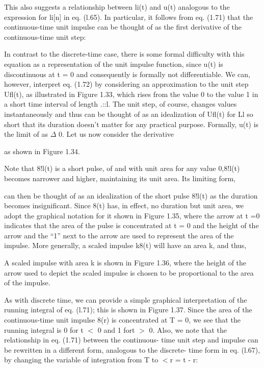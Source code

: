 \documentclass{report}
\begin{document}
This also suggests a relationship between li(t) and u(t) analogous to the expression for li[n] in eq. (l.65). In particular, it follows from eq.
(1.71) that the continuous-time unit impulse can be thought of as the first derivative of the continuous-time unit step:



In contrast to the discrete-time case, there is some formal difficulty with this equation as a representation of the unit impulse function, since
u(t) is discontinuous at t = 0 and consequently is formally not differentiable. We can, however, interpret eq. (1.72) by considering an approximation
to the unit step Ufl(t), as illustrated in Figure 1.33, which rises from the value 0 to the value 1 in a short time interval of length .::l. The
unit step, of course, changes values instantaneously and thus can be thought of as an idealization of Ufl(t) for Ll so short that its duration doesn{'}t
matter for any practical purpose. Formally, u(t) is the limit of { } { } { }as $\Delta $ { } 0. Let us now consider the derivative



as shown in Figure 1.34.



Note that 8!l(t) is a short pulse, of { } { } { } { } { } and with unit area for any value { } { } { } { } { } { }0,8!l(t) becomes narrower and higher,
maintaining its unit area. Its limiting form,



can then be thought of as an idealization of the short pulse 8!l(t) as the duration becomes insignificant. Since 8(t) has, in effect, no duration
but unit area, we adopt the graphical notation for it shown in Figure 1.35, where the arrow at t =0 indicates that the area of the pulse is concentrated
at t = 0 and the height of the arrow and the {``}1{''} next to the arrow are used to represent the area of the impulse. More generally, a scaled
impulse k8(t) will have an area k, and thus,

 

A scaled impulse with area k is shown in Figure 1.36, where the height of the arrow used to depict the scaled impulse is chosen to be proportional
to the area of the impulse.

As with discrete time, we can provide a simple graphical interpretation of the running integral of eq. (l.71); this is shown in Figure 1.37. Since
the area of the continuous-time unit impulse 8(r) is concentrated at T = 0, we see that the running integral is 0 for t $<$ 0 and 1 fort $>$ 0. Also,
we note that the relationship in eq. (1.71) between the continuous- time unit step and impulse can be rewritten in a different form, analogous to
the discrete- time form in eq. (l.67), by changing the variable of integration from T to $<$r = t - r:
\end{document}
